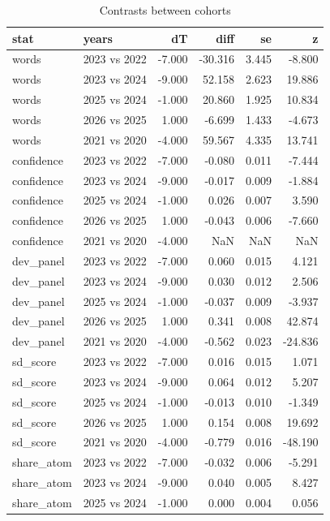 \begin{table}
\caption{Contrasts between cohorts}
\label{tab:contrasts}
\begin{tabular}{llrrrr}
\toprule
stat & years & dT & diff & se & z \\
\midrule
words & 2023 vs 2022 & -7.000 & -30.316 & 3.445 & -8.800 \\
words & 2023 vs 2024 & -9.000 & 52.158 & 2.623 & 19.886 \\
words & 2025 vs 2024 & -1.000 & 20.860 & 1.925 & 10.834 \\
words & 2026 vs 2025 & 1.000 & -6.699 & 1.433 & -4.673 \\
words & 2021 vs 2020 & -4.000 & 59.567 & 4.335 & 13.741 \\
confidence & 2023 vs 2022 & -7.000 & -0.080 & 0.011 & -7.444 \\
confidence & 2023 vs 2024 & -9.000 & -0.017 & 0.009 & -1.884 \\
confidence & 2025 vs 2024 & -1.000 & 0.026 & 0.007 & 3.590 \\
confidence & 2026 vs 2025 & 1.000 & -0.043 & 0.006 & -7.660 \\
confidence & 2021 vs 2020 & -4.000 & NaN & NaN & NaN \\
dev\_panel & 2023 vs 2022 & -7.000 & 0.060 & 0.015 & 4.121 \\
dev\_panel & 2023 vs 2024 & -9.000 & 0.030 & 0.012 & 2.506 \\
dev\_panel & 2025 vs 2024 & -1.000 & -0.037 & 0.009 & -3.937 \\
dev\_panel & 2026 vs 2025 & 1.000 & 0.341 & 0.008 & 42.874 \\
dev\_panel & 2021 vs 2020 & -4.000 & -0.562 & 0.023 & -24.836 \\
sd\_score & 2023 vs 2022 & -7.000 & 0.016 & 0.015 & 1.071 \\
sd\_score & 2023 vs 2024 & -9.000 & 0.064 & 0.012 & 5.207 \\
sd\_score & 2025 vs 2024 & -1.000 & -0.013 & 0.010 & -1.349 \\
sd\_score & 2026 vs 2025 & 1.000 & 0.154 & 0.008 & 19.692 \\
sd\_score & 2021 vs 2020 & -4.000 & -0.779 & 0.016 & -48.190 \\
share\_atom & 2023 vs 2022 & -7.000 & -0.032 & 0.006 & -5.291 \\
share\_atom & 2023 vs 2024 & -9.000 & 0.040 & 0.005 & 8.427 \\
share\_atom & 2025 vs 2024 & -1.000 & 0.000 & 0.004 & 0.056 \\

\end{tabular}
\end{table}
